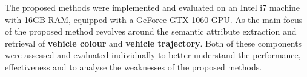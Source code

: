 The proposed methods were implemented and evaluated on an Intel i7 machine with 16GB RAM, equipped with a GeForce GTX 1060 GPU. As the main focus of the proposed method revolves around the semantic attribute extraction and retrieval of \textbf{vehicle colour} and \textbf{vehicle trajectory}. Both of these components were assessed and evaluated individually to better understand the performance, effectiveness and to analyse the weaknesses of the proposed methods.




